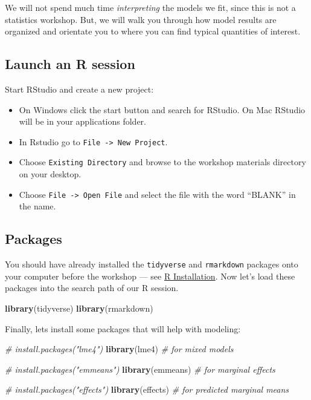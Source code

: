 \documentclass[]{book}
\newenvironment{Shaded}{\begin{snugshade}}{\end{snugshade}}
\newcommand{\CommentTok}[1]{\textcolor[rgb]{0.56,0.35,0.01}{\textit{#1}}}
\newcommand{\KeywordTok}[1]{\textcolor[rgb]{0.13,0.29,0.53}{\textbf{#1}}}
\newcommand{\NormalTok}[1]{#1}
\providecommand{\tightlist}{%
  \setlength{\itemsep}{0pt}\setlength{\parskip}{0pt}}
\begin{document}
We will not spend much time \emph{interpreting} the models we fit, since this is not a statistics workshop.
But, we will walk you through how model results are organized and orientate you to where you can find
typical quantities of interest.

\hypertarget{launch-an-r-session}{%
\subsection{Launch an R session}\label{launch-an-r-session}}

Start RStudio and create a new project:

\begin{itemize}
\tightlist
\item
  On Windows click the start button and search for RStudio. On Mac
  RStudio will be in your applications folder.
\item
  In Rstudio go to \texttt{File\ -\textgreater{}\ New\ Project}.
\item
  Choose \texttt{Existing\ Directory} and browse to the workshop materials directory on your desktop.
\item
  Choose \texttt{File\ -\textgreater{}\ Open\ File} and select the file with the word ``BLANK'' in the name.
\end{itemize}

\hypertarget{packages}{%
\subsection{Packages}\label{packages}}

You should have already installed the \texttt{tidyverse} and \texttt{rmarkdown}
packages onto your computer before the workshop
--- see \href{./Rinstall.html}{R Installation}.
Now let's load these packages into the search path of our R session.

\begin{Shaded}
\begin{Highlighting}[]
\KeywordTok{library}\NormalTok{(tidyverse)}
\KeywordTok{library}\NormalTok{(rmarkdown)}
\end{Highlighting}
\end{Shaded}

Finally, lets install some packages that will help with modeling:

\begin{Shaded}
\begin{Highlighting}[]
\CommentTok{# install.packages("lme4")}
\KeywordTok{library}\NormalTok{(lme4)  }\CommentTok{# for mixed models}

\CommentTok{# install.packages("emmeans")}
\KeywordTok{library}\NormalTok{(emmeans)  }\CommentTok{# for marginal effects}

\CommentTok{# install.packages("effects")}
\KeywordTok{library}\NormalTok{(effects)  }\CommentTok{# for predicted marginal means}
\end{Highlighting}
\end{Shaded}
\end{document}
